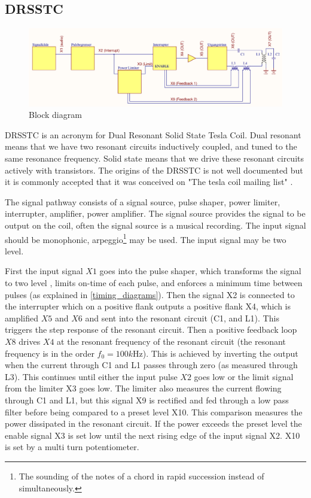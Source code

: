\subsection{DRSSTC}
\label{DRSSTC}

\begin{figure}
    \centering
    \includegraphics[width=\textwidth]{img/FunksjonsBlokkskjema.pdf}
    \caption{Block diagram}
    \label{fig:func_block}
\end{figure}

DRSSTC is an acronym for Dual Resonant Solid State Tesla Coil. Dual resonant means that we have two resonant circuits inductively coupled, and tuned to the same resonance frequency. Solid state means that we drive these resonant circuits actively with transistors. The origins of the DRSSTC is not well documented but it is commonly accepted that it was conceived on "The tesla coil mailing list" \citep{pupman}.

The signal pathway consists of a signal source, pulse shaper, power limiter, interrupter, amplifier, power amplifier.
The signal source provides the signal to be output on the coil, often the signal source is a musical recording.
The input signal should be monophonic, arpeggio\footnote{The sounding of the notes of a chord in rapid succession instead of simultaneously.} may be used. The input signal may be two level.

First the input signal $X1$ goes into the pulse shaper, which transforms the signal to two level , limits on-time of each pulse, and enforces a minimum time between pulses (as explained in \cref{timing_diagrams}). Then the signal X2 is connected to the interrupter which on a positive flank outputs a positive flank X4, which is amplified $X5$ and $X6$ and sent into the resonant circuit (C1, and L1). This triggers the step response of the resonant circuit. Then a positive feedback loop $X8$ drives $X4$ at the resonant frequency of the resonant circuit (the resonant frequency is in the order $f_0 = 100k$Hz). This is achieved by inverting the output when the current through C1 and L1 passes through zero (as measured through L3). This continues until either the input pulse $X2$ goes low or the limit signal from the limiter X3 goes low.
The limiter also measures the current flowing through C1 and L1, but this signal X9 is rectified and fed through a low pass filter before being compared to a preset level X10. This comparison measures the power dissipated in the resonant circuit. If the power exceeds the preset level the enable signal X3 is set low until the next rising edge of the input signal X2. X10 is set by a multi turn potentiometer.

